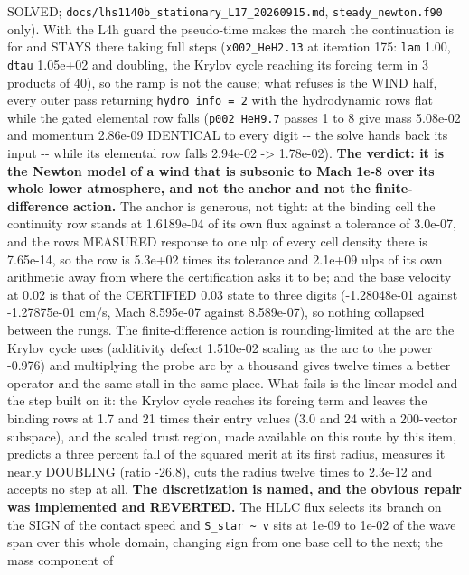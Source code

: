 \documentclass[english,a4paper]{my_memo}
\begin{document}
\begin{itemize}
  SOLVED; \texttt{docs/lhs1140b\_stationary\_L17\_20260915.md},
  \texttt{steady\_newton.f90} only). With the L4h guard the pseudo-time makes the
  march the continuation is for and STAYS there taking full steps
  (\texttt{x002\_HeH2.13} at iteration 175: \texttt{lam} 1.00, \texttt{dtau} 1.05e+02 and doubling,
  the Krylov cycle reaching its forcing term in 3 products of 40), so the ramp
  is not the cause; what refuses is the WIND half, every outer pass returning
  \texttt{hydro\ info\ =\ 2} with the hydrodynamic rows flat while the gated elemental
  row falls (\texttt{p002\_HeH9.7} passes 1 to 8 give mass 5.08e-02 and momentum
  2.86e-09 IDENTICAL to every digit -\/- the solve hands back its input -\/- while
  its elemental row falls 2.94e-02 -\textgreater{} 1.78e-02). \textbf{The verdict: it is the
  Newton model of a wind that is subsonic to Mach 1e-8 over its whole lower
  atmosphere, and not the anchor and not the finite-difference action.} The
  anchor is generous, not tight: at the binding cell the continuity row stands
  at 1.6189e-04 of its own flux against a tolerance of 3.0e-07, and the row\textquotesingle s
  MEASURED response to one ulp of every cell density there is 7.65e-14, so the
  row is 5.3e+02 times its tolerance and 2.1e+09 ulps of its own arithmetic
  away from where the certification asks it to be; and the base velocity at
  0.02 is that of the CERTIFIED 0.03 state to three digits (-1.28048e-01
  against -1.27875e-01 cm/s, Mach 8.595e-07 against 8.589e-07), so nothing
  collapsed between the rungs. The finite-difference action is rounding-limited
  at the arc the Krylov cycle uses (additivity defect 1.510e-02 scaling as the
  arc to the power -0.976) and multiplying the probe arc by a thousand gives
  twelve times a better operator and the same stall in the same place. What
  fails is the linear model and the step built on it: the Krylov cycle reaches
  its forcing term and leaves the binding rows at 1.7 and 21 times their entry
  values (3.0 and 24 with a 200-vector subspace), and the scaled trust region,
  made available on this route by this item, predicts a three percent fall of
  the squared merit at its first radius, measures it nearly DOUBLING (ratio
  -26.8), cuts the radius twelve times to 2.3e-12 and accepts no step at all.
  \textbf{The discretization is named, and the obvious repair was implemented and
  REVERTED.} The HLLC flux selects its branch on the SIGN of the contact speed
  and \texttt{S\_star\ \textasciitilde{}\ v} sits at 1e-09 to 1e-02 of the wave span over this whole
  domain, changing sign from one base cell to the next; the mass component of

\end{itemize}
\end{document}
